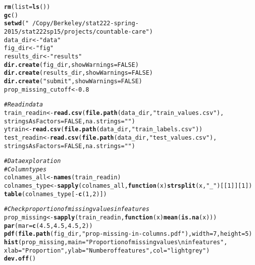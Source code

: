 \documentclass{article}\usepackage[]{graphicx}\usepackage[]{color}
\makeatletter
\newcommand{\hlnum}[1]{\textcolor[rgb]{0.686,0.059,0.569}{#1}}%
\newcommand{\hlstr}[1]{\textcolor[rgb]{0.192,0.494,0.8}{#1}}%
\newcommand{\hlcom}[1]{\textcolor[rgb]{0.678,0.584,0.686}{\textit{#1}}}%
\newcommand{\hlopt}[1]{\textcolor[rgb]{0,0,0}{#1}}%
\newcommand{\hlstd}[1]{\textcolor[rgb]{0.345,0.345,0.345}{#1}}%
\newcommand{\hlkwa}[1]{\textcolor[rgb]{0.161,0.373,0.58}{\textbf{#1}}}%
\newcommand{\hlkwb}[1]{\textcolor[rgb]{0.69,0.353,0.396}{#1}}%
\newcommand{\hlkwc}[1]{\textcolor[rgb]{0.333,0.667,0.333}{#1}}%
\newcommand{\hlkwd}[1]{\textcolor[rgb]{0.737,0.353,0.396}{\textbf{#1}}}%
\newenvironment{kframe}{%
 \def\at@end@of@kframe{}%
 \ifinner\ifhmode%
  \def\at@end@of@kframe{\end{minipage}}%
  \begin{minipage}{\columnwidth}%
 \fi\fi%
 \def\FrameCommand##1{\hskip\@totalleftmargin \hskip-\fboxsep
 \colorbox{shadecolor}{##1}\hskip-\fboxsep
     \hskip-\linewidth \hskip-\@totalleftmargin \hskip\columnwidth}%
 \MakeFramed {\advance\hsize-\width
   \@totalleftmargin\z@ \linewidth\hsize
   \@setminipage}}%
 {\par\unskip\endMakeFramed%
 \at@end@of@kframe}
\newenvironment{knitrout}{}{} %
\makeatother
\begin{document}
\begin{knitrout}
\color{fgcolor}\begin{kframe}
\begin{alltt}
\hlkwd{rm}\hlstd{(}\hlkwc{list} \hlstd{=} \hlkwd{ls}\hlstd{())}
\hlkwd{gc}\hlstd{()}
\hlkwd{setwd}\hlstd{(}\hlstr{"~/Copy/Berkeley/stat222-spring-2015/stat222sp15/projects/countable-care"}\hlstd{)}
\hlstd{data_dir} \hlkwb{<-} \hlstr{"data"}
\hlstd{fig_dir} \hlkwb{<-} \hlstr{"fig"}
\hlstd{results_dir} \hlkwb{<-} \hlstr{"results"}
\hlkwd{dir.create}\hlstd{(fig_dir,} \hlkwc{showWarnings} \hlstd{=} \hlnum{FALSE}\hlstd{)}
\hlkwd{dir.create}\hlstd{(results_dir,} \hlkwc{showWarnings} \hlstd{=} \hlnum{FALSE}\hlstd{)}
\hlkwd{dir.create}\hlstd{(}\hlstr{"submit"}\hlstd{,} \hlkwc{showWarnings} \hlstd{=} \hlnum{FALSE}\hlstd{)}
\hlstd{prop_missing_cutoff} \hlkwb{<-} \hlnum{0.8}

\hlcom{# Read in data}
\hlstd{train_readin} \hlkwb{<-} \hlkwd{read.csv}\hlstd{(}\hlkwd{file.path}\hlstd{(data_dir,} \hlstr{"train_values.csv"}\hlstd{),}
                         \hlkwc{stringsAsFactors} \hlstd{=} \hlnum{FALSE}\hlstd{,} \hlkwc{na.strings} \hlstd{=} \hlstr{""}\hlstd{)}
\hlstd{ytrain} \hlkwb{<-} \hlkwd{read.csv}\hlstd{(}\hlkwd{file.path}\hlstd{(data_dir,} \hlstr{"train_labels.csv"}\hlstd{))}
\hlstd{test_readin} \hlkwb{<-} \hlkwd{read.csv}\hlstd{(}\hlkwd{file.path}\hlstd{(data_dir,} \hlstr{"test_values.csv"}\hlstd{),}
                        \hlkwc{stringsAsFactors} \hlstd{=} \hlnum{FALSE}\hlstd{,} \hlkwc{na.strings} \hlstd{=} \hlstr{""}\hlstd{)}

\hlcom{# Data exploration}
\hlcom{# Column types}
\hlstd{colnames_all} \hlkwb{<-} \hlkwd{names}\hlstd{(train_readin)}
\hlstd{colnames_type} \hlkwb{<-} \hlkwd{sapply}\hlstd{(colnames_all,} \hlkwa{function}\hlstd{(}\hlkwc{x}\hlstd{)} \hlkwd{strsplit}\hlstd{(x,} \hlstr{"_"}\hlstd{)[[}\hlnum{1}\hlstd{]][}\hlnum{1}\hlstd{])}
\hlkwd{table}\hlstd{(colnames_type[}\hlopt{-}\hlkwd{c}\hlstd{(}\hlnum{1}\hlstd{,} \hlnum{2}\hlstd{)])}

\hlcom{# Check proportion of missing values in features}
\hlstd{prop_missing} \hlkwb{<-} \hlkwd{sapply}\hlstd{(train_readin,} \hlkwa{function}\hlstd{(}\hlkwc{x}\hlstd{)} \hlkwd{mean}\hlstd{(}\hlkwd{is.na}\hlstd{(x)))}
\hlkwd{par}\hlstd{(}\hlkwc{mar} \hlstd{=} \hlkwd{c}\hlstd{(}\hlnum{4.5}\hlstd{,} \hlnum{4.5}\hlstd{,} \hlnum{4.5}\hlstd{,} \hlnum{2}\hlstd{))}
\hlkwd{pdf}\hlstd{(}\hlkwd{file.path}\hlstd{(fig_dir,} \hlstr{"prop-missing-in-columns.pdf"}\hlstd{),} \hlkwc{width} \hlstd{=} \hlnum{7}\hlstd{,} \hlkwc{height} \hlstd{=} \hlnum{5}\hlstd{)}
\hlkwd{hist}\hlstd{(prop_missing,} \hlkwc{main} \hlstd{=} \hlstr{"Proportion of missing values\textbackslash{}nin features"}\hlstd{,}
     \hlkwc{xlab} \hlstd{=} \hlstr{"Proportion"}\hlstd{,} \hlkwc{ylab} \hlstd{=} \hlstr{"Number of features"}\hlstd{,} \hlkwc{col} \hlstd{=} \hlstr{"lightgrey"}\hlstd{)}
\hlkwd{dev.off}\hlstd{()}


\end{alltt}
\end{kframe}
\end{knitrout}
\end{document}
